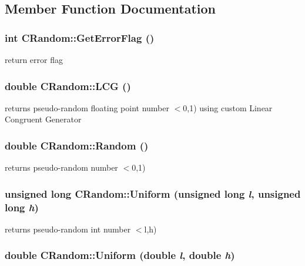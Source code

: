 \subsection{Member Function Documentation}
\hypertarget{classCRandom_a662c309ef5b0164bb5efb4d79b7813a0}{
\subsubsection[{GetErrorFlag}]{\setlength{\rightskip}{0pt plus 5cm}int CRandom::GetErrorFlag ()}}
\label{classCRandom_a662c309ef5b0164bb5efb4d79b7813a0}
return error flag \hypertarget{classCRandom_a029fd3f1f77bd26afd46efddedfc53b0}{
\subsubsection[{LCG}]{\setlength{\rightskip}{0pt plus 5cm}double CRandom::LCG ()}}
\label{classCRandom_a029fd3f1f77bd26afd46efddedfc53b0}
returns pseudo-\/random floating point number $<$0,1) using custom Linear Congruent Generator \hypertarget{classCRandom_ae63e58f1c95ebb7e9e80e5c5fe37eb34}{
\subsubsection[{Random}]{\setlength{\rightskip}{0pt plus 5cm}double CRandom::Random ()}}
\label{classCRandom_ae63e58f1c95ebb7e9e80e5c5fe37eb34}
returns pseudo-\/random number $<$0,1) \hypertarget{classCRandom_a12c39e3dbb6b13583cb320c56b1f29f5}{
\subsubsection[{Uniform}]{\setlength{\rightskip}{0pt plus 5cm}unsigned long CRandom::Uniform (unsigned long {\em l}, \/  unsigned long {\em h})}}
\label{classCRandom_a12c39e3dbb6b13583cb320c56b1f29f5}
returns pseudo-\/random int number $<$l,h) \hypertarget{classCRandom_a9f7a991be94c453958411fb96bea1320}{
\subsubsection[{Uniform}]{\setlength{\rightskip}{0pt plus 5cm}double CRandom::Uniform (double {\em l}, \/  double {\em h})}}

